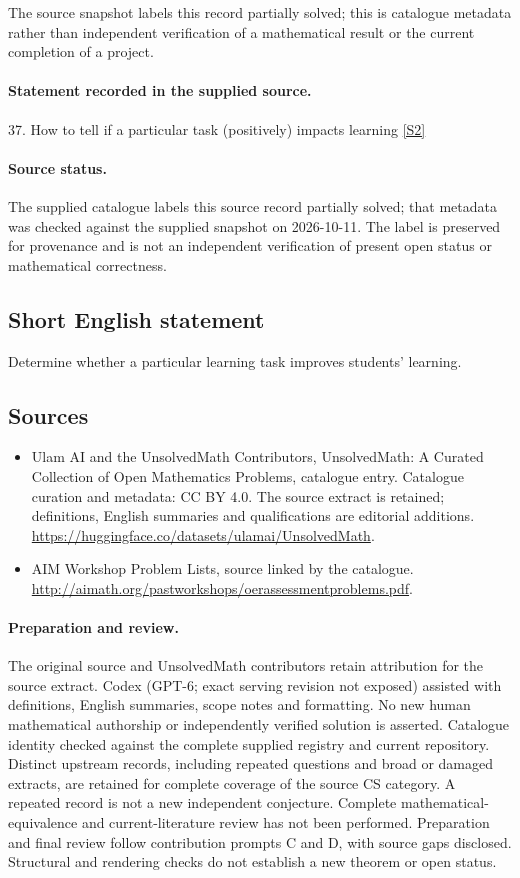 \documentclass[11pt]{article}
\begin{document}
The source snapshot labels this record partially solved; this is catalogue metadata rather than independent verification of a mathematical result or the current completion of a project.
\paragraph{Statement recorded in the supplied source.}
37. How to tell if a particular task (positively) impacts learning \href{http://aimath.org/pastworkshops/oerassessmentproblems.pdf}{[S2]}
\paragraph{Source status.}
The supplied catalogue labels this source record partially solved; that metadata was checked against the supplied snapshot on 2026-10-11. The label is preserved for provenance and is not an independent verification of present open status or mathematical correctness.
\subsection{Short English statement}
Determine whether a particular learning task improves students' learning.
\subsection{Sources}
\begin{itemize}
\item[S1] Ulam AI and the UnsolvedMath Contributors, UnsolvedMath: A Curated Collection of Open Mathematics Problems, catalogue entry. Catalogue curation and metadata: CC BY 4.0. The source extract is retained; definitions, English summaries and qualifications are editorial additions.
\url{https://huggingface.co/datasets/ulamai/UnsolvedMath}.
\item[S2] AIM Workshop Problem Lists, source linked by the catalogue.
\url{http://aimath.org/pastworkshops/oerassessmentproblems.pdf}.
\end{itemize}
\paragraph{Preparation and review.}
The original source and UnsolvedMath contributors retain attribution for the source extract. Codex (GPT-6; exact serving revision not exposed) assisted with definitions, English summaries, scope notes and formatting. No new human mathematical authorship or independently verified solution is asserted. Catalogue identity checked against the complete supplied registry and current repository. Distinct upstream records, including repeated questions and broad or damaged extracts, are retained for complete coverage of the source CS category. A repeated record is not a new independent conjecture. Complete mathematical-equivalence and current-literature review has not been performed. Preparation and final review follow contribution prompts C and D, with source gaps disclosed. Structural and rendering checks do not establish a new theorem or open status.
\label{end:statement}
\end{document}
